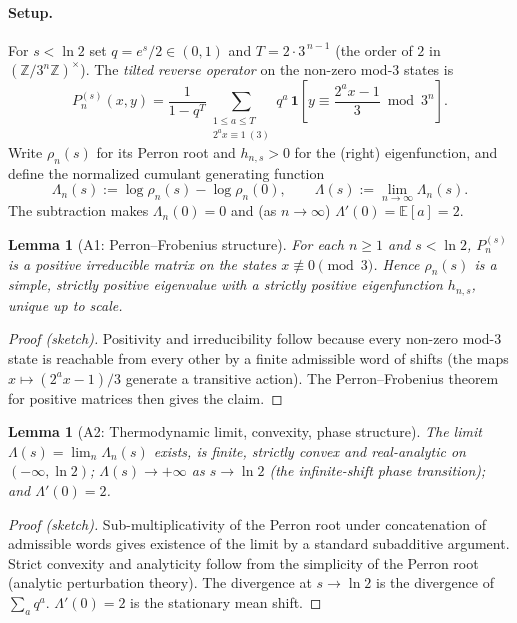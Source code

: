 \documentclass[12pt,a4paper]{article}
\newtheorem{lemma}[theorem]{Lemma}
\begin{document}
\paragraph{Setup.} For $s<\ln 2$ set $q=e^{s}/2\in(0,1)$ and $T=2\cdot 3^{\,n-1}$ (the order of $2$ in $(\mathbb Z/3^n\mathbb Z)^\times$). The \emph{tilted reverse operator} on the non-zero mod-$3$ states is
\[
P_n^{(s)}(x,y)=\frac{1}{1-q^{T}}\sum_{\substack{1\le a\le T\\ 2^{a}x\equiv1\ (3)}} q^{a}\,
\mathbf 1\!\left[y\equiv\frac{2^{a}x-1}{3}\bmod 3^{n}\right].
\]
Write $\rho_n(s)$ for its Perron root and $h_{n,s}>0$ for the (right) eigenfunction, and define the normalized cumulant generating function
\[
\Lambda_n(s):=\log\rho_n(s)-\log\rho_n(0),\qquad \Lambda(s):=\lim_{n\to\infty}\Lambda_n(s).
\]
The subtraction makes $\Lambda_n(0)=0$ and (as $n\to\infty$) $\Lambda'(0)=\mathbb E[a]=2$.

\begin{lemma}[A1: Perron--Frobenius structure]
For each $n\ge1$ and $s<\ln2$, $P_n^{(s)}$ is a positive irreducible matrix on the states $x\not\equiv0\pmod3$. Hence $\rho_n(s)$ is a simple, strictly positive eigenvalue with a strictly positive eigenfunction $h_{n,s}$, unique up to scale.
\end{lemma}
\begin{proof}[Proof (sketch)]
Positivity and irreducibility follow because every non-zero mod-$3$ state is reachable from every other by a finite admissible word of shifts (the maps $x\mapsto(2^ax-1)/3$ generate a transitive action). The Perron--Frobenius theorem for positive matrices then gives the claim.
\end{proof}


\begin{lemma}[A2: Thermodynamic limit, convexity, phase structure]
The limit $\Lambda(s)=\lim_n\Lambda_n(s)$ exists, is finite, strictly convex and real-analytic on $(-\infty,\ln2)$; $\Lambda(s)\to+\infty$ as $s\to\ln2$ (the infinite-shift phase transition); and $\Lambda'(0)=2$.
\end{lemma}
\begin{proof}[Proof (sketch)]
Sub-multiplicativity of the Perron root under concatenation of admissible words gives existence of the limit by a standard subadditive argument. Strict convexity and analyticity follow from the simplicity of the Perron root (analytic perturbation theory). The divergence at $s\to\ln2$ is the divergence of $\sum_a q^a$. $\Lambda'(0)=2$ is the stationary mean shift.
\end{proof}
\end{document}
